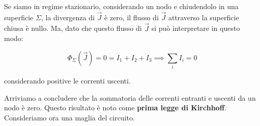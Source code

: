 Se siamo in regime stazionario, considerando un nodo e chiudendolo in una superficie $\Sigma$, la divergenza di $\vec{J}$ è zero, il flusso di $\vec{J}$ attraverso la superficie chiusa è nullo. Ma, dato che questo flusso di $\vec{J}$ si può interpretare in questo modo:

\[
	\Phi_{\Sigma}(\vec{J} )= 0 = I_1+I_2+I_3 \implies \boxed{\sum_i I_i=0}
\]

considerando positive le correnti uscenti.

Arriviamo a concludere che la sommatoria delle correnti entranti e uscenti da un nodo è zero. Questo risultato è noto come \textbf{prima legge di Kirchhoff}.
Consideriamo ora una maglia del circuito.

\begin{figure}[htpb]
	\centering


	\begin{tikzpicture}[x=0.75pt,y=0.75pt,yscale=-1,xscale=1]


\end{tikzpicture}
\end{figure}
